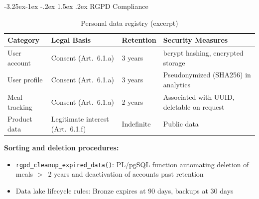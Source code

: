 \documentclass[a4paper,11pt,oneside,openany]{report}
\makeatletter
\renewcommand\subsubsection{\@startsection{subsubsection}{3}{\z@}%
  {-3.25ex\@plus -1ex \@minus -.2ex}%
  {1.5ex \@plus .2ex}%
  {\normalfont\normalsize\bfseries\color{ntblue}}}
\newcommand{\rgpd}{RGPD}
\makeatother
\begin{document}
\subsubsection{\rgpd{} Compliance}

\begin{table}[H]
\centering
\caption{Personal data registry (excerpt)}
\label{tab:rgpd}
\begin{tabularx}{\textwidth}{L{2.8cm} L{2.5cm} L{2cm} L{5.5cm}}
\toprule
\textbf{Category} & \textbf{Legal Basis} & \textbf{Retention} & \textbf{Security Measures} \\
\midrule
User account & Consent (Art.~6.1.a) & 3 years & bcrypt hashing, encrypted storage \\
User profile & Consent (Art.~6.1.a) & 3 years & Pseudonymized (SHA256) in analytics \\
Meal tracking & Consent (Art.~6.1.a) & 2 years & Associated with UUID, deletable on request \\
Product data & Legitimate interest (Art.~6.1.f) & Indefinite & Public data \\
\bottomrule
\end{tabularx}
\end{table}

\textbf{Sorting and deletion procedures:}
\begin{itemize}[nosep]
  \item \texttt{rgpd\_cleanup\_expired\_data()}: PL/pgSQL function automating
        deletion of meals $>$~2 years and deactivation of accounts past
        retention
  \item Data lake lifecycle rules: Bronze expires at 90 days,
        backups at 30 days
\end{itemize}
\end{document}
